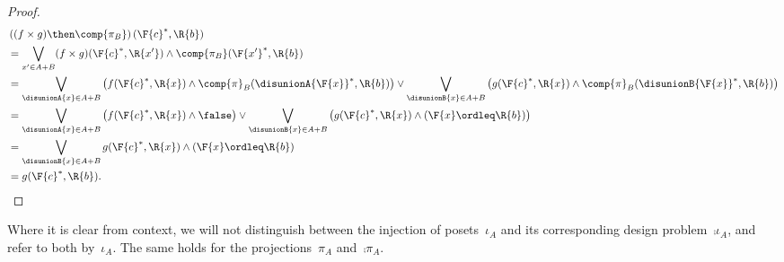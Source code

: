 \begin{proof}
\begin{equation}
\begin{aligned}
			 & \left((f\times g)\then \comp{\pi_B}\right)(\F{c}^*,\R{b})                                                         \\
			 & =\bigvee_{x'\in A+B} (f\times g)(\F{c}^*,\R{x'}) \wedge \comp{\pi_B}(\F{x'}^*,\R{b})                              \\
			 & =\bigvee_{\disunionA{x}\in A+B}\left( f(\F{c}^*,\R{x}) \wedge \comp{\pi}_B(\disunionA{\F{x}}^*,\R{b})\right) \vee
			\bigvee_{\disunionB{x}\in A+B}\left( g(\F{c}^*,\R{x}) \wedge \comp{\pi}_B(\disunionB{\F{x}}^*,\R{b})\right)          \\
			 & =\bigvee_{\disunionA{x}\in A+B}\left( f(\F{c}^*,\R{x}) \wedge \false \right) \vee
			\bigvee_{\disunionB{x}\in A+B}\left( g(\F{c}^*,\R{x}) \wedge (\F{x}\ordleq \R{b}) \right)                            \\
			 & =\bigvee_{\disunionB{x}\in A+B} g(\F{c}^*,\R{x}) \wedge (\F{x}\ordleq \R{b})                                      \\
			 & =g(\F{c}^*,\R{b}).
		\end{aligned}
	\end{equation}
\end{proof}

\begin{remark}
	Where it is clear from context, we will not distinguish between the injection of posets~$\iota_A$ and its corresponding design problem~$\comp{\iota_A}$, and refer to both by~$\iota_A$.
	The same holds for the projections~$\pi_A$ and~$\comp{\pi_A}$.
\end{remark}

